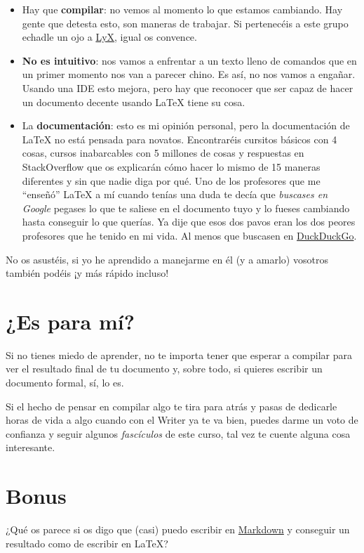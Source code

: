 \begin{itemize}
\item
  Hay que \textbf{compilar}: no vemos al momento lo que estamos
  cambiando. Hay gente que detesta esto, son maneras de trabajar. Si
  pertenecéis a este grupo echadle un ojo a
  \href{http://www.lyx.org/}{LyX}, igual os convence.
\item
  \textbf{No es intuitivo}: nos vamos a enfrentar a un texto lleno de
  comandos que en un primer momento nos van a parecer chino. Es así, no
  nos vamos a engañar. Usando una IDE esto mejora, pero hay que
  reconocer que ser capaz de hacer un documento decente usando LaTeX
  tiene su cosa.
\item
  La \textbf{documentación}: esto es mi opinión personal, pero la
  documentación de LaTeX no está pensada para novatos. Encontraréis
  cursitos básicos con 4 cosas, cursos inabarcables con 5 millones de
  cosas y respuestas en StackOverflow que os explicarán cómo hacer lo
  mismo de 15 maneras diferentes y sin que nadie diga por qué. Uno de
  los profesores que me ``enseñó'' LaTeX a mí cuando tenías una duda te
  decía que \emph{buscases en Google} pegases lo que te saliese en el
  documento tuyo y lo fueses cambiando hasta conseguir lo que querías.
  Ya dije que esos dos pavos eran los dos peores profesores que he
  tenido en mi vida. Al menos que buscasen en
  \href{https://duckduckgo.com/api}{DuckDuckGo}.
\end{itemize}

No os asustéis, si yo he aprendido a manejarme en él (y a amarlo)
vosotros también podéis ¡y más rápido incluso!

\section{¿Es para mí?}\label{es-para-mi}

Si no tienes miedo de aprender, no te importa tener que esperar a
compilar para ver el resultado final de tu documento y, sobre todo, si
quieres escribir un documento formal, sí, lo es.

Si el hecho de pensar en compilar algo te tira para atrás y pasas de
dedicarle horas de vida a algo cuando con el Writer ya te va bien,
puedes darme un voto de confianza y seguir algunos \emph{fascículos} de
este curso, tal vez te cuente alguna cosa interesante.

\section{Bonus}\label{bonus}

¿Qué os parece si os digo que (casi)
puedo escribir en 
\href{http://daringfireball.net/projects/markdown/}{Markdown} 
y conseguir un resultado como de escribir en LaTeX?
